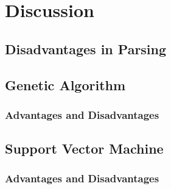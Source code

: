 \chapter{Discussion}

\section{Disadvantages in Parsing}

\section{Genetic Algorithm}

\subsection{Advantages and Disadvantages}\label{sec:genDisadvantages}

\section{Support Vector Machine}

\subsection{Advantages and Disadvantages}\label{sec:svmDisadvantages}


